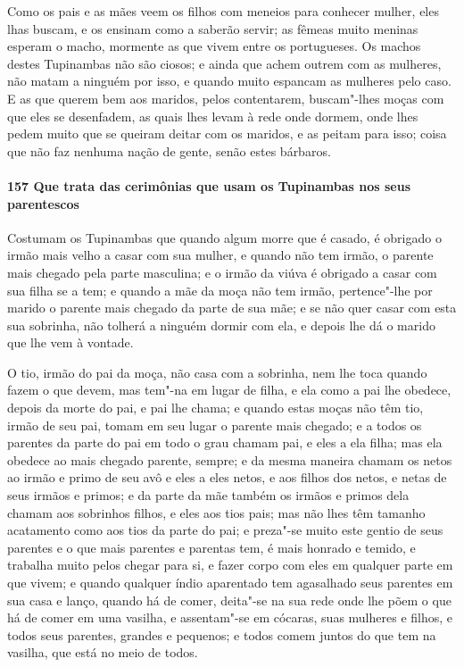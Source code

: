 Como os pais e as mães veem os filhos com meneios para conhecer mulher, eles lhas buscam,
e os ensinam como a saberão servir; as fêmeas muito meninas esperam o macho, mormente as
que vivem entre os portugueses. Os machos destes Tupinambas não são ciosos; e ainda que
achem outrem com as mulheres, não matam a ninguém por isso, e quando muito espancam as
mulheres pelo caso. E as que querem bem aos maridos, pelos contentarem, buscam"-lhes moças
com que eles se desenfadem, as quais lhes levam à rede onde dormem, onde lhes pedem muito
que se queiram deitar com os maridos, e as peitam para isso; coisa que não faz nenhuma
nação de gente, senão estes bárbaros.

\paragraph{157 Que trata das cerimônias que usam os Tupinambas nos seus parentescos}

Costumam os Tupinambas que quando algum morre que é casado, é obrigado o irmão mais velho
a casar com sua mulher, e quando não tem irmão, o parente mais chegado pela parte
masculina; e o irmão da viúva é obrigado a casar com sua filha se a tem; e quando a mãe da
moça não tem irmão, pertence"-lhe por marido o parente mais chegado da parte de sua mãe; e
se não quer casar com esta sua sobrinha, não tolherá a ninguém dormir com ela, e depois
lhe dá o marido que lhe vem à vontade.

O tio, irmão do pai da moça, não casa com a sobrinha, nem lhe toca quando fazem o que
devem, mas tem"-na em lugar de filha, e ela como a pai lhe obedece, depois da morte do pai,
e pai lhe chama; e quando estas moças não têm tio, irmão de seu pai, tomam em seu lugar o
parente mais chegado; e a todos os parentes da parte do pai em todo o grau chamam pai, e
eles a ela filha; mas ela obedece ao mais chegado parente, sempre; e da mesma maneira
chamam os netos ao irmão e primo de seu avô e eles a eles netos, e aos filhos dos netos, e
netas de seus irmãos e primos; e da parte da mãe também os irmãos e primos dela chamam aos
sobrinhos filhos, e eles aos tios pais; mas não lhes têm tamanho acatamento como aos tios
da parte do pai; e preza"-se muito este gentio de seus parentes e o que mais parentes e
parentas tem, é mais honrado e temido, e trabalha muito pelos chegar para si, e fazer
corpo com eles em qualquer parte em que vivem; e quando qualquer índio aparentado tem
agasalhado seus parentes em sua casa e lanço, quando há de comer, deita"-se na sua rede
onde lhe põem o que há de comer em uma vasilha, e assentam"-se em cócaras, suas mulheres e
filhos, e todos seus parentes, grandes e pequenos; e todos comem juntos do que tem na
vasilha, que está no meio de todos.

